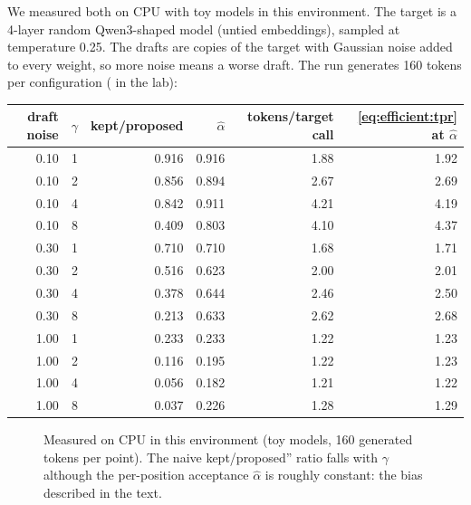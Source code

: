 We measured both on CPU with toy models in this environment. The target is a 4-layer
random Qwen3-shaped model (untied embeddings), sampled at temperature 0.25. The drafts
are copies of the target with Gaussian noise added to every weight, so more noise means
a worse draft. The run generates 160 tokens per configuration
( in the lab):
\begin{center}\small
\begin{tabular}{rrrrrr}
\toprule
draft noise & $\gamma$ & kept/proposed & $\hat\alpha$ & tokens/target call & \cref{eq:efficient:tpr} at $\hat\alpha$ \\
\midrule
0.10 & 1 & 0.916 & 0.916 & 1.88 & 1.92 \\
0.10 & 2 & 0.856 & 0.894 & 2.67 & 2.69 \\
0.10 & 4 & 0.842 & 0.911 & 4.21 & 4.19 \\
0.10 & 8 & 0.409 & 0.803 & 4.10 & 4.37 \\
0.30 & 1 & 0.710 & 0.710 & 1.68 & 1.71 \\
0.30 & 2 & 0.516 & 0.623 & 2.00 & 2.01 \\
0.30 & 4 & 0.378 & 0.644 & 2.46 & 2.50 \\
0.30 & 8 & 0.213 & 0.633 & 2.62 & 2.68 \\
1.00 & 1 & 0.233 & 0.233 & 1.22 & 1.23 \\
1.00 & 2 & 0.116 & 0.195 & 1.22 & 1.23 \\
1.00 & 4 & 0.056 & 0.182 & 1.21 & 1.22 \\
1.00 & 8 & 0.037 & 0.226 & 1.28 & 1.29 \\
\bottomrule
\end{tabular}
\end{center}

\begin{figure}[t]
\centering
{}
\caption{Measured on CPU in this environment (toy models, 160 generated tokens per point).
The naive kept/proposed'' ratio falls with $\gamma$ although the per-position
acceptance $\hat\alpha$ is roughly constant: the bias described in the text.}
\label{fig:efficient:alpha-bias}
\end{figure}


